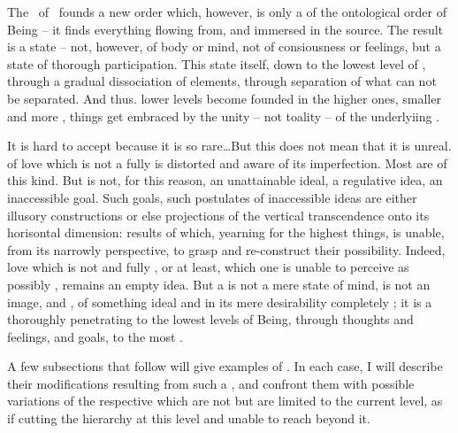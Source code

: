 \pa
The \sch\ of \yes\ founds a new order which, however, is only a 
 of the ontological order of Being -- it finds 
everything flowing from, and immersed in the 
source. The result is a state -- not, however, of body or mind, not of 
consiousness or feelings, but a  state of thorough 
participation. This state  itself, down to the lowest 
level of , through a gradual dissociation of 
elements, through separation of what  can not be 
separated. And thus. lower levels become founded in the higher ones, 
smaller and more ,  things get embraced by the 
unity -- not toality -- of the underlyiing \yes. 

\pa It is hard to accept because it is so rare\ldots But this does not
mean that it is unreal.   
 of love which is not a fully  is distorted and aware of its imperfection.  Most
 are of this kind.  But  is not, for this
reason, an unattainable ideal, a regulative idea, an inaccessible
goal.  Such goals, such postulates of inaccessible ideas are either
illusory constructions or else projections of the vertical transcendence
onto its horisontal dimension: results of  which,
yearning for the highest things, is unable, from its narrowly
 perspective, to grasp and re-construct their
 possibility.  Indeed, {love} which is not
 and fully , or at least, which one is
unable to perceive as possibly , remains an empty idea. 
But a  is not a mere state of mind, is not an 
image,  and , 
of something ideal and in its mere desirability completely
; it is a thoroughly 
penetrating to the lowest levels of Being, through thoughts and feelings,
 and goals, to the most  .
 
\pa A few subsections that follow will give examples of .  In each case, I will describe 
their  modifications resulting from such a 
, and confront them with possible 
variations of the respective  which are not 
but are limited to the current level, as if cutting the hierarchy at 
this level and unable to reach beyond it.



